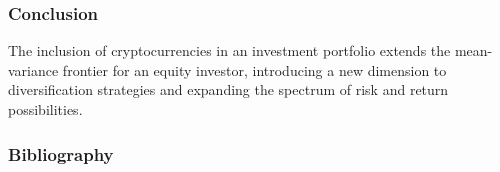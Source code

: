 \documentclass{beamer}
\begin{document}
\begin{frame}
\frametitle{Conclusion}
The inclusion of cryptocurrencies in an investment portfolio extends the mean-variance frontier for an equity investor, 
introducing a new dimension to diversification strategies and expanding the spectrum of risk and return possibilities.
 \nocite{wikiref}
\end{frame}

\begin{frame}
\frametitle{Bibliography}



\end{frame}
\end{document}

